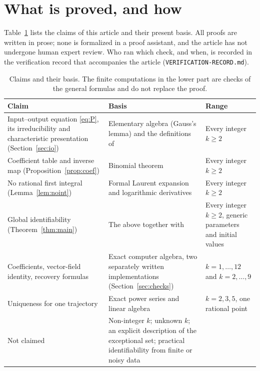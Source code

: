 \documentclass[10pt,a4paper]{article}
\theoremstyle{definition}
\theoremstyle{remark}
\begin{document}
\section{What is proved, and how}
\label{sec:status}
Table~\ref{tab:status} lists the claims of this article and their present
basis. All proofs are written in prose; none is formalized in a proof
assistant, and the article has not undergone human expert review. Who
ran which check, and when, is recorded in the verification record that
accompanies the article (\mbox{\texttt{VERIFICATION-RECORD.md}}).
\begin{table}[ht]
\centering\small
\begin{tabular}{@{}>{\raggedright\arraybackslash}p{.30\linewidth}
>{\raggedright\arraybackslash}p{.38\linewidth}
>{\raggedright\arraybackslash}p{.24\linewidth}@{}}
\toprule
Claim & Basis & Range\\
\midrule
Input--output equation \eqref{eq:P}, its irreducibility and
characteristic presentation (Section~\ref{sec:io}) & Elementary algebra
(Gauss's lemma) and the definitions of \cite{OPT} & Every integer
$k\geq2$\\
Coefficient table and inverse map (Proposition~\ref{prop:coef}) &
Binomial theorem & Every integer $k\geq2$\\
No rational first integral (Lemma~\ref{lem:noint}) & Formal Laurent
expansion and logarithmic derivatives & Every integer $k\geq2$\\
Global identifiability (Theorem~\ref{thm:main}) & The above together with
\cite[Theorem~4.7, Corollary~5.7, Proposition~3.1]{OPT} & Every integer
$k\geq2$, generic parameters and initial values\\
\midrule
Coefficients, vector-field identity, recovery formulas &
Exact computer algebra, two separately written implementations
(Section~\ref{sec:checks}) & $k=1,\dots,12$ and $k=2,\dots,9$\\
Uniqueness for one trajectory & Exact power series and linear algebra &
$k=2,3,5$, one rational point\\
\midrule
Not claimed & Non-integer $k$; unknown $k$; an explicit description of
the exceptional set; practical identifiability from finite or noisy
data & \\
\bottomrule
\end{tabular}
\caption{Claims and their basis. The finite computations in the lower
part are checks of the general formulas and do not replace the proof.}
\label{tab:status}
\end{table}
\end{document}
